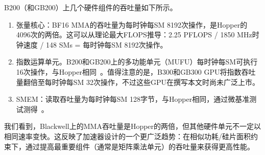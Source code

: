 B200（和GB200）上几个硬件组件的吞吐量如下所示。
\begin{enumerate}[itemsep=0pt,topsep=0pt,leftmargin=*]
  \item 张量核心：BF16 MMA的吞吐量为每时钟每SM 8192次操作，是Hopper的4096次的两倍。这可以从理论最大FLOPS推导：2.25 PFLOPS / 1850 MHz时钟速度 / 148 SMs = 每时钟每SM 8192次操作。
  \item 指数运算单元。B200和GB200上的多功能单元（MUFU）每时钟每SM可执行16次操作，与Hopper相同~\citep{cuda}。值得注意的是，B300和GB300 GPU将指数吞吐量翻倍至每时钟每SM 32次操作，不过这些GPU在撰写本文时尚未广泛上市。
  \item SMEM：读取吞吐量为每时钟每SM 128字节，与Hopper相同，通过微基准测试测得~\citep{luo2025dissecting}。
\end{enumerate}
我们看到，Blackwell上的MMA吞吐量是Hopper的两倍，但其他硬件单元不一定以相同速率变快。这反映了加速器设计的一个更广泛趋势：在相似功耗/硅片面积约束下，通过提高最重要组件（通常是矩阵乘法单元）的吞吐量来获得更高性能。
